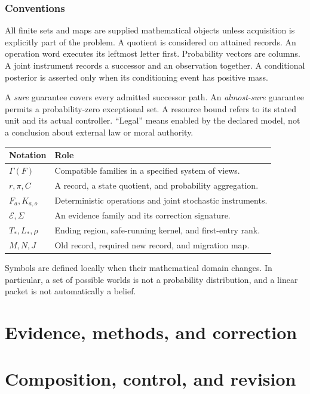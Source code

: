 \documentclass[11pt,oneside,openany]{book}
\theoremstyle{definition}\newtheorem{definition}[theorem]{Definition}
\begin{document}
\section*{Conventions}
All finite sets and maps are supplied mathematical objects unless acquisition is explicitly part of the problem. A quotient is considered on attained records. An operation word executes its leftmost letter first. Probability vectors are columns. A joint instrument records a successor and an observation together. A conditional posterior is asserted only when its conditioning event has positive mass.

A \emph{sure} guarantee covers every admitted successor path. An \emph{almost-sure} guarantee permits a probability-zero exceptional set. A resource bound refers to its stated unit and its actual controller. ``Legal'' means enabled by the declared model, not a conclusion about external law or moral authority.

\begin{center}
\begin{tabular}{@{}p{.20\linewidth}p{.70\linewidth}@{}}\toprule
Notation & Role\\\midrule
$\Gamma(F)$ & Compatible families in a specified system of views.\\
$r,\pi,C$ & A record, a state quotient, and probability aggregation.\\
$F_a,K_{a,o}$ & Deterministic operations and joint stochastic instruments.\\
$\mathcal E,\Sigma$ & An evidence family and its correction signature.\\
$T_*,L_*,\rho$ & Ending region, safe-running kernel, and first-entry rank.\\
$M,N,J$ & Old record, required new record, and migration map.\\\bottomrule
\end{tabular}
\end{center}
Symbols are defined locally when their mathematical domain changes. In particular, a set of possible worlds is not a probability distribution, and a linear packet is not automatically a belief.

\tableofcontents

\mainmatter
\part{Evidence, methods, and correction}

\part{Composition, control, and revision}




\end{document}
